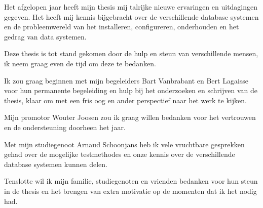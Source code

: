 \documentclass[master=cws,masteroption=gs]{kulemt}
\begin{document}
\setlength{\parindent}{0cm}
\setlength{\parskip}{\baselineskip}

\begin{preface}
Het afgelopen jaar heeft mijn thesis mij talrijke nieuwe ervaringen en uitdagingen gegeven. Het heeft mij kennis bijgebracht over de verschillende database systemen en de probleemwereld van het installeren, configureren, onderhouden en het gedrag van data systemen. 

Deze thesis is tot stand gekomen door de hulp en steun van verschillende mensen, ik neem graag even de tijd om deze te bedanken. 

Ik zou graag beginnen met mijn begeleiders Bart Vanbrabant en Bert Lagaisse voor hun permanente begeleiding en hulp bij het onderzoeken en schrijven van de thesis, klaar om met een fris oog en ander perspectief naar het werk te kijken. 

Mijn promotor Wouter Joosen zou ik graag willen bedanken voor het vertrouwen en de ondersteuning doorheen het jaar. 

Met mijn studiegenoot Arnaud Schoonjans heb ik vele vruchtbare gesprekken gehad over de mogelijke testmethodes en onze kennis over de verschillende database systemen kunnen delen. 

Tenslotte wil ik mijn familie, studiegenoten en vrienden bedanken voor hun steun in de thesis en het brengen van extra motivatie op de momenten dat ik het nodig had. 

  
\end{preface}
\end{document}
